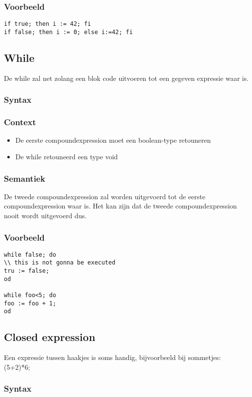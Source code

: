 \documentclass[]{article}
\begin{document}
\subsubsection{Voorbeeld}
\begin{lstlisting}[style=SELMA]
if true; then i := 42; fi
if false; then i := 0; else i:=42; fi
\end{lstlisting}

\subsection{While}
De while zal net zolang een blok code uitvoeren tot een gegeven expressie waar is.
\subsubsection{Syntax}

\subsubsection{Context}
\begin{itemize}
\item De eerste compoundexpression moet een boolean-type retouneren
\item De while retouneerd een type void
\end{itemize}
\subsubsection{Semantiek}
De tweede compoundexpression zal worden uitgevoerd tot de eerste compoundexpression waar is. Het kan zijn dat de tweede compoundexpression nooit wordt uitgevoerd dus.
\subsubsection{Voorbeeld}
\begin{lstlisting}[style=SELMA]
while false; do 
\\ this is not gonna be executed
tru := false;
od

while foo<5; do
foo := foo + 1;
od
\end{lstlisting}

\subsection{Closed expression}
Een expressie tussen haakjes is soms handig, bijvoorbeeld bij sommetjes: (5+2)*6;
\subsubsection{Syntax}

\end{document}
